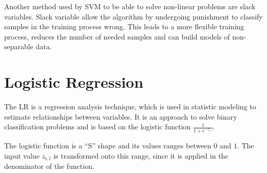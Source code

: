 Another method used by \ac{SVM} to be able to solve non-linear problems are slack variables.
Slack variable allow the algorithm by undergoing punishment to classify samples in the training process wrong. %
This leads to a more flexible training process, reduces the number of needed samples and can build models of non-separable data.



\section{Logistic Regression}
\label{sec:lr}

The \acf{LR} is a regression analysis technique, which is used in statistic modeling to estimate relationships between variables. %
It is an approach to solve binary classification problems and is based on the logistic function $\frac{1}{1 + e^{-z_{i,l}}}$.

The logistic function is a ``S'' shape and its values ranges between $0$ and $1$.
The input value $z_{i,l}$ is transformed onto this range, since it is applied in the denominator of the function. %

